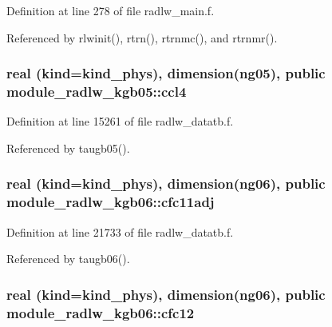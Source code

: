 Definition at line 278 of file radlw\+\_\+main.\+f.



Referenced by rlwinit(), rtrn(), rtrnmc(), and rtrnmr().

\subsubsection[{\texorpdfstring{ccl4}{ccl4}}]{\setlength{\rightskip}{0pt plus 5cm}real (kind=kind\+\_\+phys), dimension(ng05), public module\+\_\+radlw\+\_\+kgb05\+::ccl4}\hypertarget{group__module__radlw__main_ga15c6b3bfa9d8cbf20099dd4f364444b5}{}\label{group__module__radlw__main_ga15c6b3bfa9d8cbf20099dd4f364444b5}


Definition at line 15261 of file radlw\+\_\+datatb.\+f.



Referenced by taugb05().

\subsubsection[{\texorpdfstring{cfc11adj}{cfc11adj}}]{\setlength{\rightskip}{0pt plus 5cm}real (kind=kind\+\_\+phys), dimension(ng06), public module\+\_\+radlw\+\_\+kgb06\+::cfc11adj}\hypertarget{group__module__radlw__main_ga8b0813723ba69b1afbe2552f6b730267}{}\label{group__module__radlw__main_ga8b0813723ba69b1afbe2552f6b730267}


Definition at line 21733 of file radlw\+\_\+datatb.\+f.



Referenced by taugb06().

\subsubsection[{\texorpdfstring{cfc12}{cfc12}}]{\setlength{\rightskip}{0pt plus 5cm}real (kind=kind\+\_\+phys), dimension(ng06), public module\+\_\+radlw\+\_\+kgb06\+::cfc12}\hypertarget{group__module__radlw__main_ga44f5934520edc537b5df004774b0ef71}{}\label{group__module__radlw__main_ga44f5934520edc537b5df004774b0ef71}


